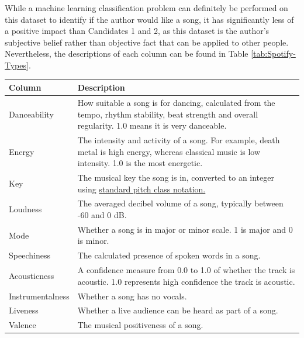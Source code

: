 \documentclass[12pt]{report}
\begin{document}
While a machine learning classification problem can definitely be performed on this dataset to identify if the author would like a song, 
it has significantly less of a positive impact than Candidates 1 and 2, as this dataset is the author's subjective belief rather than objective
fact that can be applied to other people. Nevertheless, the descriptions of each column can be found in Table \ref{tab:Spotify-Types}.

\begin{table}[H]
    \centering
        \begin{tabular}{ |p{} | p{}|}
            \hline
            \cellcolor{blue!25}Column & \cellcolor{blue!25}Description\\
            \hline
            Danceability & How suitable a song is for dancing, calculated from the tempo, rhythm stability, beat strength and overall regularity. 1.0 means it is very danceable. \\
            \hline
            Energy & The intensity and activity of a song. For example, death metal is high energy, whereas classical music is low intensity. 1.0 is the most energetic.\\
            \hline
            Key & The musical key the song is in, converted to an integer using \href{https://smbutterfield.github.io/ibmt17-18/22-intro-to-non-diatonic-materials/b2-tx-pcintnotation.html}{standard pitch class notation.}\autocite{butterfield_22b_nodate} \\
            \hline
            Loudness & The averaged decibel volume of a song, typically between -60 and 0 dB.\\
            \hline
            Mode & Whether a song is in major or minor scale. 1 is major and 0 is minor.\\
            \hline
            Speechiness & The calculated presence of spoken words in a song.\\
            \hline
            Acousticness & A confidence measure from 0.0 to 1.0 of whether the track is acoustic. 1.0 represents high confidence the track is acoustic.\\
            \hline
            Instrumentalness & Whether a song has no vocals.\\
            \hline
            Liveness & Whether a live audience can be heard as part of a song.\\
            \hline
            Valence & The musical positiveness of a song.\\
            \hline

\end{tabular}
\end{table}
\end{document}

